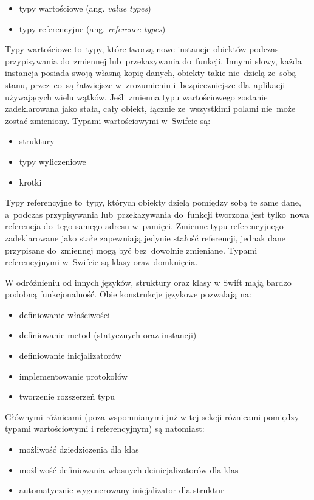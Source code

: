 \documentclass[mgr, shortabstract]{iithesis}
\newcommand{\ang}[1]{ang. \textit{#1}}
\begin{document}
\begin{itemize}
    \item typy wartościowe (\ang{value types})
    \item typy referencyjne (\ang{reference types})
\end{itemize}

Typy wartościowe to~typy, które tworzą nowe instancje obiektów podczas przypisywania do~zmiennej lub~przekazywania do~funkcji. Innymi słowy, każda instancja posiada swoją własną kopię danych, obiekty takie nie~dzielą ze~sobą stanu, przez~co~są łatwiejsze w~zrozumieniu i~bezpieczniejsze dla~aplikacji używających wielu wątków. Jeśli zmienna typu wartościowego zostanie zadeklarowana jako stała, cały obiekt, łącznie ze~wszystkimi polami nie~może zostać zmieniony. Typami wartościowymi w~Swifcie są:

\begin{itemize}
    \item struktury
    \item typy wyliczeniowe
    \item krotki
\end{itemize}

Typy referencyjne to~typy, których obiekty dzielą pomiędzy sobą te same dane, a~podczas przypisywania lub~przekazywania do~funkcji tworzona jest tylko~nowa referencja do~tego samego adresu w~pamięci. Zmienne typu referencyjnego zadeklarowane jako stałe zapewniają jedynie stałość referencji, jednak dane przypisane do~zmiennej mogą być bez~dowolnie zmieniane. Typami referencyjnymi w~Swifcie są klasy oraz~domknięcia.

W odróżnieniu od innych języków, struktury oraz klasy w Swift mają bardzo podobną funkcjonalność. Obie konstrukcje językowe pozwalają na:

\begin{itemize}
    \item definiowanie właściwości
    \item definiowanie metod (statycznych oraz instancji)
    \item definiowanie inicjalizatorów
    \item implementowanie protokołów
    \item tworzenie rozszerzeń typu
\end{itemize}

Głównymi różnicami (poza wspomnianymi już w tej sekcji różnicami pomiędzy typami wartościowymi i referencyjnym) są natomiast:

\begin{itemize}
    \item możliwość dziedziczenia dla klas
    \item możliwość definiowania własnych deinicjalizatorów dla klas
    \item automatycznie wygenerowany inicjalizator dla struktur
\end{itemize}
\end{document}
